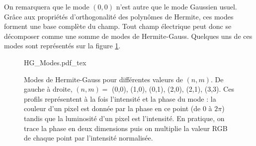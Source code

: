 On remarquera que le mode $(0,0)$ n'est autre que le mode Gaussien usuel. Grâce aux propriétés d'orthogonalité des polynômes de Hermite, ces modes forment une base complète du champ. Tout champ électrique peut donc se décomposer comme une somme de modes de Hermite-Gauss. Quelques uns de ces modes sont représentés sur la figure \ref{Fig:hgmodes}.

\begin{figure}[!ht]
\centering
\def\svgwidth{\columnwidth}
{HG_Modes.pdf_tex}
\caption{Modes de Hermite-Gauss pour différentes valeurs de $(n,m)$. De gauche à droite, $(n,m) =$ (0,0), (1,0), (0,1), (2,0), (2,1), (3,3). Ces profils représentent à la fois l'intensité et la phase du mode : la couleur d'un pixel est donnée par la phase en ce point (de 0 à $2\pi$) tandis que la luminosité d'un pixel est l'intensité. En pratique, on trace la phase en deux dimensions puis on multiplie la valeur RGB de chaque point par l'intensité normalisée.}
\label{Fig:hgmodes}
\end{figure}

